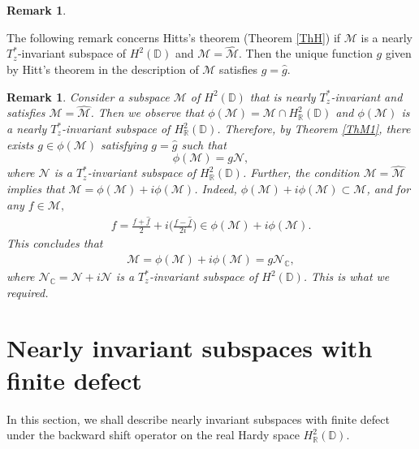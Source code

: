 \documentclass[11pt]{amsart}
\newtheorem{remark}[theorem]{Remark}
\numberwithin{equation}{section}
\begin{document}
\begin{remark}
\end{remark}

\textnormal{The following remark concerns Hitts's theorem (Theorem \ref{ThH}) if $\mathcal{M}$ is a nearly $T^*_z$-invariant subspace of $H^2(\mathbb{D})$ and $\mathcal{M}=\widehat{\mathcal{M}}$. Then the unique function $g$ given by Hitt's theorem  in the description of $\mathcal{M}$ satisfies $g=\widehat{g}$.}
\begin{remark}\label{Rem3.5}
Consider a subspace $\mathcal{M}$ of $H^2(\mathbb{D})$ that is nearly $T^*_z$-invariant and satisfies $\mathcal{M}=\widehat{\mathcal{M}}$. Then we observe that $\phi(\mathcal{M})=\mathcal{M} \cap H^2_{\mathbb{R}}(\mathbb{D})$ and  $\phi(\mathcal{M})$ is a nearly $T^*_z$-invariant subspace of $H^2_{\mathbb{R}}(\mathbb{D})$. Therefore, by Theorem \ref{ThM1}, there exists $g \in \phi(\mathcal{M})$ satisfying $g=\widehat{g}$ such that $$\phi(\mathcal{M})=g\mathcal{N},$$
where $\mathcal{N}$ is a $T^*_z$-invariant subspace of $H^2_{\mathbb{R}}(\mathbb{D})$. Further, the condition $\mathcal{M}=\widehat{\mathcal{M}}$ implies that $\mathcal{M}=\phi(\mathcal{M}) + i\phi(\mathcal{M})$. Indeed, $\phi(\mathcal{M}) + i\phi(\mathcal{M}) \subset \mathcal{M}$, and for any $f \in \mathcal{M},$
\begin{eqnarray*}
 f=\frac{f + \widehat{f}}{2} + i\Bigg(\frac{f - \widehat{f}}{2i}\Bigg) \in \phi(\mathcal{M}) + i\phi(\mathcal{M}). 
\end{eqnarray*}
This concludes that
\begin{align*}
 \mathcal{M}= \phi(\mathcal{M}) + i\phi(\mathcal{M})=g\mathcal{N}_{\mathbb{C}}, 
\end{align*} 
where $\mathcal{N_{\mathbb{C}}}=\mathcal{N} + i\mathcal{N}$ is a $T^*_z$-invariant subspace of $H^2(\mathbb{D})$. This is what we required.
\end{remark}

     
\section{Nearly invariant subspaces with finite defect} \label{NISF}

\textnormal{In this section, we shall describe nearly invariant subspaces with finite defect under the backward shift operator on the real Hardy space $H^2_{\mathbb{R}}(\mathbb{D})$.  }
\end{document}
